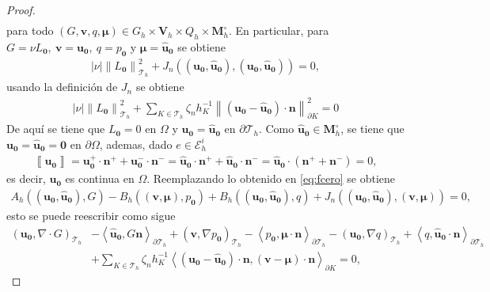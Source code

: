 \documentclass[10pt,a4paper]{report}
\newcommand{\bs}{\boldsymbol}
\newcommand{\Th}{\mathscr{T}_{h}}
\providecommand{\abs}[1]{\left\lvert#1\right\rvert}
\providecommand{\norm}[1]{\left\lVert#1\right\rVert}
\providecommand{\salto}[1]{\left\llbracket#1\right\rrbracket}
\providecommand{\PI}[2]{\left\langle #1,#2  \right\rangle}
\providecommand{\Pii}[2]{\left( #1,#2  \right)}
\begin{document}
\begin{proof}
\begin{align}
    \end{align} 
    para todo $\left(G,\bs{v},q,\bs{\mu}\right)\in G_{h}\times\bs{V}_{h}\times Q_{h}\times \bs{M}^{\circ}_{h}$. En particular, para $G = \nu L_{\bs{0}},\ \bs{v} = \bs{u}_{\bs{0}},\ q = p_{\bs{0}}$ y $\bs{\mu} = \bs{\hat{u}}_{\bs{0}}$ se obtiene 
    \begin{align*}
    	\abs{\nu}\norm{L_{\bs{0}}}^{2}_{\Th} + J_{n}\left((\bs{u}_{\bs{0}},\bs{\hat{u}}_{\bs{0}}),(\bs{u}_{\bs{0}},\bs{\hat{u}}_{\bs{0}})\right) = 0,
    \end{align*}
    usando la definición de $J_{n}$ se obtiene
    \begin{align*}
    	\abs{\nu}\norm{L_{\bs{0}}}^{2}_{\Th} + \sum_{K\in\Th} \zeta_{n}h^{-1}_{K}\norm{\left(\bs{u}_{\bs{0}} - \bs{\hat{u}}_{\bs{0}}\right)\cdot\bs{n}}^{2}_{\partial K} = 0
    \end{align*}
    De aquí se tiene que $L_{\bs{0}} = 0$ en $\Omega$ y $\bs{u}_{\bs{0}} = \bs{\hat{u}}_{\bs{0}}$ en $\partial \Th$. Como $\bs{\hat{u}}_{\bs{0}}\in \bs{M}^{\circ}_{h}$, se tiene que $\bs{u}_{\bs{0}} = \bs{\hat{u}}_{\bs{0}} = \bs{0}$ en $\partial\Omega$, ademas, dado $e\in \mathscr{E}^{i}_{h}$
    \begin{align*}
    	\salto{\bs{u}_{\bs{0}}} = \bs{u}_{\bs{0}}^{+}\cdot \bs{n}^{+} +  \bs{u}_{\bs{0}}^{-}\cdot \bs{n}^{-} = \bs{\hat{u}}_{\bs{0}}\cdot \bs{n}^{+} + \bs{\hat{u}}_{\bs{0}}\cdot \bs{n}^{-} = \bs{\hat{u}}_{\bs{0}}\cdot(\bs{n}^{+} + \bs{n}^{-}) = 0,
    \end{align*}
    es decir, $\bs{u}_{\bs{0}}$ es continua en $\Omega$. Reemplazando lo obtenido en \ref{eq:fcero} se obtiene
    \begin{align*}
    	A_{h}\left((\bs{u}_{\bs{0}},\bs{\hat{u}}_{\bs{0}}),G\right) - 	B_{h}\left((\bs{v},\bs{\mu}),p_{\bs{0}}\right) + B_{h}\left((\bs{u}_{\bs{0}},\bs{\hat{u}}_{\bs{0}}),q\right) + J_{n}\left((\bs{u}_{\bs{0}},\bs{\hat{u}}_{\bs{0}}),(\bs{v},\bs{\mu})\right)  = 0,
    \end{align*}
    esto se puede reescribir como sigue
    \begin{align*}
    	\Pii{\bs{u}_{\bs{0}}}{\nabla\cdot G}_{\Th} &- \PI{\bs{\hat{u}}_{\bs{0}}}{G\bs{n}}_{\partial \Th} + \Pii{\bs{v}}{\nabla p_{\bs{0}}}_{\Th} - \PI{p_{\bs{0}}}{\bs{\mu}\cdot\bs{n}}_{\partial\Th} - \Pii{\bs{u}_{\bs{0}}}{\nabla q}_{\Th} + \PI{q}{\bs{\hat{u}}_{\bs{0}}\cdot\bs{n}}_{\partial\Th}\\ &+ \sum_{K\in\Th} \zeta_{n}h^{-1}_{K}\PI{\left(\bs{u}_{\bs{0}} - \bs{\hat{u}}_{\bs{0}}\right)\cdot\bs{n}}{\left(\bs{v}-\bs{\mu}\right)\cdot\bs{n}}_{\partial K} = 0,

\end{align*}
\end{proof}
\end{document}
